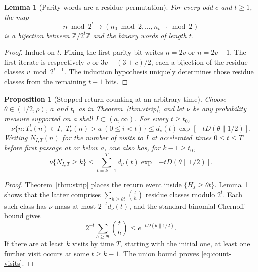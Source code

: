 \documentclass[11pt,a4paper]{article}
\newtheorem{lemma}[theorem]{Lemma}
\newtheorem{proposition}[theorem]{Proposition}
\theoremstyle{remark}
\begin{document}
\begin{lemma}[Parity words are a residue permutation]\label{lem:parity}
For every odd $c$ and $t\ge1$, the map
\[
 n\bmod2^t\longmapsto
 (n_0\bmod2,\ldots,n_{t-1}\bmod2)
\]
is a bijection between $\mathbb Z/2^t\mathbb Z$ and the binary words
of length $t$.
\end{lemma}
\begin{proof}
Induct on $t$.  Fixing the first parity bit writes $n=2v$ or
$n=2v+1$.  The first iterate is respectively $v$ or
$3v+(3+c)/2$, each a bijection of the residue classes
$v\bmod2^{t-1}$.  The induction hypothesis uniquely determines
those residue classes from the remaining $t-1$ bits.
\end{proof}

\begin{proposition}[Stopped-return counting at an arbitrary time]\label{prop:count}
Choose $\theta\in(1/2,\rho)$, $a$ and $t_0$ as in
Theorem~\ref{thm:strip}, and let $\nu$ be any probability measure
supported on a shell $I\subset(a,\infty)$.  For every $t\ge t_0$,
\begin{equation}\label{eq:count}
\nu\{n:T_c^t(n)\in I,\;T_c^i(n)>a\ (0\le i<t)\}
\le d_\nu(t)\exp[-tD(\theta\|1/2)].
\end{equation}
Writing $N_{I,T}(n)$ for the number of visits to $I$ at accelerated
times $0\le t\le T$ before first passage at or below $a$, one also
has, for $k-1\ge t_0$,
\begin{equation}\label{eq:count-visits}
\nu\{N_{I,T}\ge k\}\le
\sum_{t=k-1}^{T}d_\nu(t)\exp[-tD(\theta\|1/2)].
\end{equation}
\end{proposition}
\begin{proof}
Theorem~\ref{thm:strip} places the return event inside
$\{H_t\ge\theta t\}$.  Lemma~\ref{lem:parity} shows that the latter
comprises $\sum_{h\ge\theta t}\binom{t}{h}$ residue classes
modulo $2^t$.  Each such class has $\nu$-mass at most
$2^{-t}d_\nu(t)$, and the standard binomial Chernoff bound gives
\[
 2^{-t}\sum_{h\ge\theta t}\binom{t}{h}
 \le e^{-tD(\theta\|1/2)}.
\]
If there are at least $k$ visits by time $T$, starting with the
initial one, at least one further visit occurs at some $t\ge k-1$.
The union bound proves \eqref{eq:count-visits}.
\end{proof}
\end{document}

